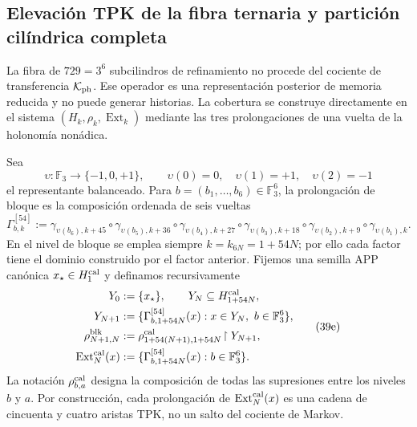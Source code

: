 \subsection{Elevación TPK de la fibra ternaria y partición cilíndrica completa}
\label{subsec:elevacion-catalogal-ch}

La fibra de \(729=3^6\) subcilindros de refinamiento no procede del cociente de transferencia
\(\mathcal K_{\rm ph}\). Ese operador es una representación posterior de memoria
reducida y no puede generar historias. La cobertura se construye directamente
en el sistema \((H_k,\rho_k,\operatorname{Ext}_k)\) mediante las tres
prolongaciones de una vuelta de la holonomía nonádica.





Sea
\[
 \upsilon:\mathbb F_3\longrightarrow\{-1,0,+1\},\qquad
 \upsilon(0)=0,\quad\upsilon(1)=+1,\quad\upsilon(2)=-1
\]
el representante balanceado. Para
\(b=(b_1,\ldots,b_6)\in\mathbb F_3^6\), la prolongación de bloque es la
composición ordenada de seis vueltas
\[
 \Gamma_{b,k}^{[54]}:=
 \gamma_{\upsilon(b_6),k+45}\circ\gamma_{\upsilon(b_5),k+36}\circ
 \gamma_{\upsilon(b_4),k+27}\circ\gamma_{\upsilon(b_3),k+18}\circ
 \gamma_{\upsilon(b_2),k+9}\circ\gamma_{\upsilon(b_1),k}.
\tag{39d}
\label{eq:gamma-bloque-54-ch}
\]
En el nivel de bloque se emplea siempre
\(k=k_{6N}=1+54N\); por ello cada factor tiene el dominio construido por el
factor anterior.
Fijemos una semilla APP canónica \(x_\star\in H^{\rm cal}_1\) y definamos
recursivamente
\[
 \begin{aligned}
  Y_0&:=\{x_\star\},\qquad Y_N\subseteq H_{1+54N}^{\rm cal},\\
  Y_{N+1}&:=\{\Gamma_{b,1+54N}^{[54]}(x):
                 x\in Y_N,\ b\in\mathbb F_3^6\},\\
  \rho^{\rm blk}_{N+1,N}
    &:=\rho^{\rm cal}_{1+54(N+1),1+54N}
       \!\upharpoonright Y_{N+1},\\
  \operatorname{Ext}^{\rm cal}_N(x)
    &:=\{\Gamma_{b,1+54N}^{[54]}(x):b\in\mathbb F_3^6\}.
 \end{aligned}
\tag{39e}
\label{eq:sincronizacion-54-ch}
\]
La notación \(\rho^{\rm cal}_{b,a}\) designa la composición de todas las supresiones
entre los niveles \(b\) y \(a\). Por construcción, cada prolongación de
\(\operatorname{Ext}^{\rm cal}_N(x)\) es una cadena de cincuenta y cuatro
aristas TPK, no un salto del cociente de Markov.

